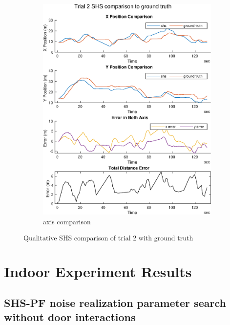 \begin{figure}[H]
\begin{subfigure}[t]{.45\textwidth}
		\includegraphics[width=\linewidth]{images/20201029_1042_trial2_shs_2}
		\caption{axis comparison}
		\label{fig:trial2_comparison}
	\end{subfigure}
	\setlength{\belowcaptionskip}{-20pt}
	\caption{Qualitative SHS comparison of trial 2 with ground truth}
	\label{fig:trial2_shs_gt_comparison}
\end{figure}


\chapter{Indoor Experiment Results}

\section{SHS-PF noise realization parameter search \textbf{without} door interactions}
\label{sec:app-shs_pf_noise_realization_no_detection}

